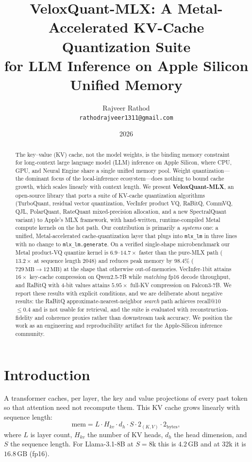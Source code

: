 \documentclass[11pt]{article}
\title{VeloxQuant-MLX: A Metal-Accelerated KV-Cache Quantization Suite\\
for LLM Inference on Apple Silicon Unified Memory}
\author{Rajveer Rathod\\\texttt{rathodrajveer1311@gmail.com}}
\date{2026}
\begin{document}
\maketitle

\begin{abstract}
The key--value (KV) cache, not the model weights, is the binding memory
constraint for long-context large language model (LLM) inference on Apple
Silicon, where CPU, GPU, and Neural Engine share a single unified memory
pool. Weight quantization---the dominant focus of the local-inference
ecosystem---does nothing to bound cache growth, which scales linearly with
context length. We present \textbf{VeloxQuant-MLX}, an open-source library
that ports a suite of KV-cache quantization algorithms (TurboQuant, residual
vector quantization, VecInfer product VQ, RaBitQ, CommVQ, QJL, PolarQuant,
RateQuant mixed-precision allocation, and a new SpectralQuant variant) to
Apple's MLX framework, with hand-written, runtime-compiled Metal compute
kernels on the hot path. Our contribution is primarily a \emph{systems} one:
a unified, Metal-accelerated cache-quantization layer that plugs into
\texttt{mlx\_lm} in three lines with no change to \texttt{mlx\_lm.generate}.
On a verified single-shape microbenchmark our Metal product-VQ quantize
kernel is $6.9$--$14.7\times$ faster than the pure-MLX path
($13.2\times$ at sequence length $2048$) and reduces peak memory by
$98.4\%$ ($729\,\mathrm{MB}\!\to\!12\,\mathrm{MB}$) at the shape that
otherwise out-of-memories. VecInfer-1bit attains $16\times$ key-cache
compression on Qwen2.5-7B while \emph{matching} fp16 decode throughput, and
RaBitQ with 4-bit values attains $5.95\times$ full-KV compression on
Falcon3-7B. We report these results with explicit conditions, and we are
deliberate about negative results: the RaBitQ approximate-nearest-neighbor
\emph{search} path achieves recall@10 $\le 0.4$ and is not usable for
retrieval, and the suite is evaluated with reconstruction-fidelity and
coherence proxies rather than downstream task accuracy. We position the work
as an engineering and reproducibility artifact for the Apple-Silicon
inference community.
\end{abstract}

\section{Introduction}
A transformer caches, per layer, the key and value projections of every past
token so that attention need not recompute them. This KV cache grows linearly
with sequence length:
\begin{equation}
\mathrm{mem} = L \cdot H_{kv} \cdot d_{h} \cdot S \cdot 2_{(K,V)} \cdot 2_{\text{bytes}},
\label{eq:kvmem}
\end{equation}
where $L$ is layer count, $H_{kv}$ the number of KV heads, $d_h$ the head
dimension, and $S$ the sequence length. For Llama-3.1-8B at $S{=}8\mathrm{k}$
this is $4.2\,\mathrm{GB}$ and at $32\mathrm{k}$ it is $16.8\,\mathrm{GB}$
(fp16).
\end{document}
